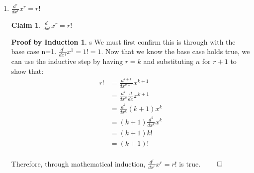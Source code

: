 \documentclass[11pt]{letter}
\newtheorem{claim}{Claim}
\theoremstyle{definition}
\newtheorem{PBI}{Proof by Induction}
\begin{document}
\begin{description}
\begin{enumerate}
				You {\bfseries may not} use the previous result. You may use {\bfseries only} the following calculus facts: the linearity properties of the integral; $\int C dx=Cx+D$ for some constant $D$; $\frac{d}{dx} x=1$; integration by parts.
			\item $\frac{d^r}{dx^r}x^r=r!$
\begin{claim}
$\frac{d^r}{dx^r}x^r=r!$
\end{claim}
\begin{PBI}s
We must first confirm this is through with the base case n=1. $\frac{d^1}{dx^1}x^1=1!=1$. Now that we know the base case holds true, we can use the inductive step by having $r=k$ and substituting $n$ for $r+1$ to show that:
\begin{align*}
r!&=\frac{d^{k+1}}{dx^{k+1}}x^{k+1} \\
&=\frac{d^k}{dx^k}\frac{d}{dx}x^{k+1} \\
&=\frac{d^k}{dx^k}(k+1)x^k \tag{substituted using inductive assumption} \\
&=(k+1)\frac{d^k}{dx^k}x^k \tag{Used the constant multiple rule of derivatives.} \\
&=(k+1)k! \tag{Substitutes equation given in the claim.} \\
&=(k+1)! \tag{Uses definition of factorial} \\
\end{align*}
\end{PBI}
Therefore, through mathematical induction, $\frac{d^r}{dx^r}x^r=r!$ is true. $\qed$


\end{enumerate}
\end{description}
\end{document}
